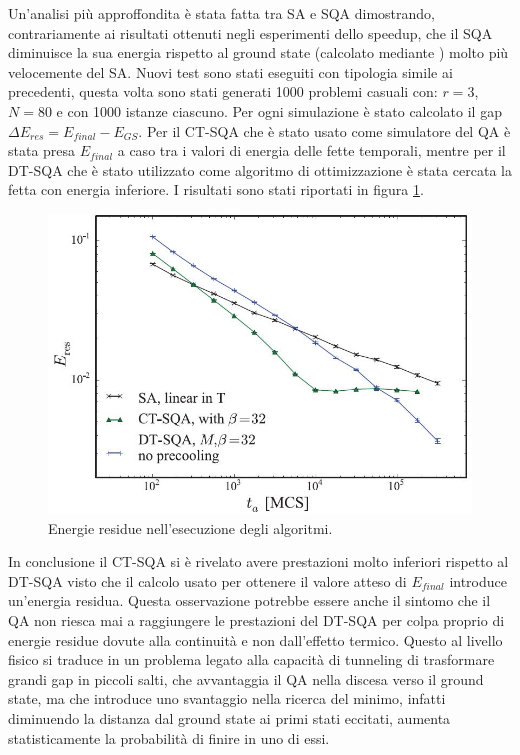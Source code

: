 \cite{QVC}Un'analisi più approffondita è stata fatta tra SA e SQA dimostrando, contrariamente ai risultati ottenuti negli esperimenti dello speedup, che il SQA diminuisce la sua energia rispetto al ground state (calcolato mediante \cite{SRVR}) molto più velocemente del SA. Nuovi test sono stati eseguiti con tipologia simile ai precedenti, questa volta sono stati generati 1000 problemi casuali con:  $r=3$, $N=80$ e con 1000 istanze ciascuno. Per ogni simulazione è stato calcolato il gap $\Delta E_{res} = E_{final} - E_{GS}$. Per il CT-SQA che è stato usato come simulatore del QA è stata presa $E_{final}$ a caso tra i valori di energia delle fette temporali, mentre per il DT-SQA che è stato utilizzato come algoritmo di ottimizzazione è stata cercata la fetta con energia inferiore.
I risultati sono stati riportati in figura \ref{figura:residua}.
\begin{figure}[htbp]
  \centering
  \includegraphics[scale=0.6]{Immagini/residua.jpg}
  \caption{Energie residue nell'esecuzione degli algoritmi.}
  \label{figura:residua}
\end{figure}

\newpage
{}
In conclusione il CT-SQA si è rivelato avere prestazioni molto inferiori rispetto al DT-SQA visto che il calcolo usato per ottenere il valore atteso di $E_{final}$ introduce un'energia residua. Questa osservazione potrebbe essere anche il sintomo che il QA non riesca mai a raggiungere le prestazioni del DT-SQA per colpa proprio di energie residue dovute alla continuità e non dall'effetto termico.
Questo al livello fisico si traduce in un problema legato alla capacità di tunneling di trasformare grandi gap in piccoli salti, che avvantaggia il QA nella discesa verso il ground state, ma che introduce uno svantaggio nella ricerca del minimo, infatti diminuendo la distanza dal ground state ai primi stati eccitati, aumenta statisticamente la probabilità di finire in uno di essi.

